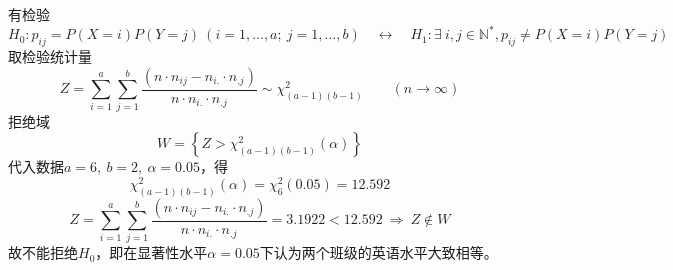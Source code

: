 \documentclass{article}
\begin{document}
\section{}  %
有检验
\[
    H_0 : p_{ij} = P(X = i) P(Y = j) \ (i=1,\ldots,a;\ j = 1,\ldots,b)
    \quad \leftrightarrow \quad
    H_1 : \exists\ i,j\in \mathbb{N}^* , p_{ij} \neq P(X = i) P(Y = j)
\]
取检验统计量
\[
    Z 
    = \sum\limits_{i=1}^{a} \sum\limits_{j=1}^{b} \frac{(n\cdot n_{ij} - n_{i.} \cdot n_{.j})}{n\cdot n_{i.} \cdot n_{.j}}    
    \sim \chi_{(a-1)(b-1)}^{2}
    \qquad (n\to \infty)
\]
拒绝域
\[
    W = 
    \left\{
        Z > \chi_{(a-1)(b-1)}^2 (\alpha)
    \right\}    
\]
代入数据$a = 6,\ b = 2,\ \alpha = 0.05$，得
\[
    \chi^2_{(a-1)(b-1)} (\alpha)
    = \chi^2_{6} (0.05)
    = 12.592
\]
\[
    Z 
    = \sum\limits_{i=1}^{a} \sum\limits_{j=1}^{b} \frac{(n\cdot n_{ij} - n_{i.} \cdot n_{.j})}{n\cdot n_{i.} \cdot n_{.j}}    
    = 3.1922
    < 12.592
    \ \Rightarrow\ 
    Z \notin W
\]
故不能拒绝$H_0$，即在显著性水平$\alpha = 0.05$下认为两个班级的英语水平大致相等。
\end{document}
